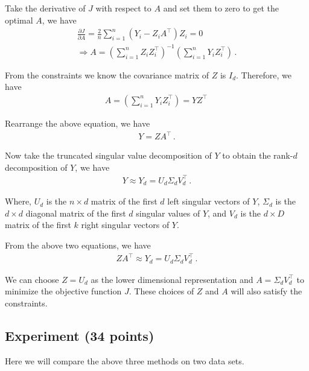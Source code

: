 \documentclass[a4paper]{article}
\theoremstyle{definition}
\newenvironment{soln}{
  \leavevmode\color{blue}\ignorespaces
}{}
\begin{document}
\begin{soln}
\begin{itemize}
    Take the derivative of $J$ with respect to $A$ and set them to zero to get the optimal $A$, we have
    \begin{align*}
      \frac{\partial J}{\partial A} = \frac{2}{n} \sum_{i=1}^n (Y_i - Z_i A^\top) Z_i = 0 \\
      \Rightarrow A = \left( \sum_{i=1}^n Z_i Z_i^\top \right)^{-1} \left( \sum_{i=1}^n Y_i Z_i^\top \right)\,.
    \end{align*}

    From the constraints we know the covariance matrix of $Z$ is $I_d$. Therefore, we have
    \begin{align*}
      A = \left( \sum_{i=1}^n Y_i Z_i^\top \right) = YZ^\top\,
    \end{align*}

    Rearrange the above equation, we have
    \begin{align*}
      Y = ZA^\top\,.
    \end{align*}

    Now take the truncated singular value decomposition of $Y$ to obtain the rank-$d$ decomposition of $Y$, we have
    \begin{align*}
      Y \approx Y_d =  U_d \Sigma_d V^\top_d\,.
    \end{align*}

    Where, $U_d$ is the $n \times d$ matrix of the first $d$ left singular vectors of $Y$, $\Sigma_d$ is the $d \times d$ diagonal matrix of the first $d$ singular values of $Y$, and $V_d$ is the $d \times D$ matrix of the first $k$ right singular vectors of $Y$.

   From the above two equations, we have
    \begin{align*}
      ZA^\top \approx Y_d =  U_d \Sigma_d V^\top_d\,.
    \end{align*}

    We can choose $Z = U_d$ as the lower dimensional representation and $A = \Sigma_d V^\top_d$ to minimize the objective function $J$. These choices of $Z$ and $A$ will also satisfy the constraints. 
  


  \end{itemize}
\end{soln}

\subsection{Experiment (34 points)}

Here we will compare the above three methods on two data sets. 
\end{document}
